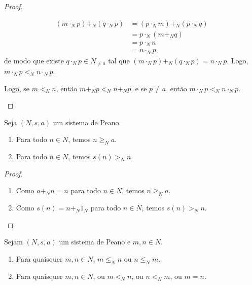 \begin{proof}
\begin{enumerate}[leftmargin=*, align=left, label=\textbf{(\alph*)}]
\begin{enumerate}[label=\roman*.]
                        \begin{align*}
                            (m \cdot_N p) +_N (q \cdot_N p) &= (p \cdot_N m) +_N (p \cdot_N q) \\
                            &= p \cdot_N (m +_N q) \\
                            &= p \cdot_N n \\
                            &= n \cdot_N p,
                        \end{align*}
                    de modo que existe $q \cdot_N p \in N_{\neq a}$ tal que $(m \cdot_N p) +_N (q \cdot_N p) = n \cdot_N p$. Logo, $m \cdot_N p <_N n \cdot_N p$.
                \end{enumerate}
            Logo, se $m <_N n$, então $m +_N p <_N n +_N p$, e se $p \neq a$, então $m \cdot_N p <_N n \cdot_N p$. \blackproof
        \end{enumerate}
\end{proof}

\begin{proposition}
    Seja $(N,s,a)$ um sistema de Peano.
        \begin{enumerate}[leftmargin=*, align=left, label=\textbf{(\alph*)}]
            \item Para todo $n \in N$, temos $n \geq_N a$.
            \item Para todo $n \in N$, temos $s(n) >_N n$.
        \end{enumerate}
\end{proposition}

\begin{proof}
    \leavevmode
        \begin{enumerate}[leftmargin=*, align=left, label=\textbf{(\alph*)}]
            \item Como $a +_N n = n$ para todo $n \in N$, temos $n \geq_N a$. \blackproof
            \item Como $s(n) = n +_N 1_N$ para todo $n \in N$, temos $s(n) >_N n$. \blackproof
        \end{enumerate}
\end{proof}

\begin{theorem} \label{teo.set:tricotomia_naturais}
    Sejam $(N,s,a)$ um sistema de Peano e $m,n \in N$.
        \begin{enumerate}[leftmargin=*, align=left, label=\textbf{(\alph*)}]
            \item Para quaisquer $m,n\in N$, $m \leq_N n$ ou $n \leq_N m$.
            \item Para quaisquer $m,n\in N$, ou $m <_N n$, ou $n <_N m$, ou $m=n$.
        \end{enumerate}
\end{theorem}


